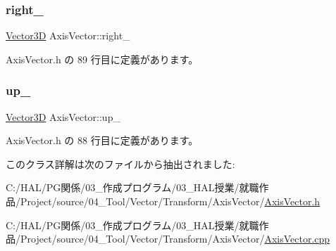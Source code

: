 \subsubsection{\texorpdfstring{right\+\_\+}{right\_}}
{\footnotesize\ttfamily \mbox{\hyperlink{class_vector3_d}{Vector3D}} Axis\+Vector\+::right\+\_\+\hspace{0.3cm}{\ttfamily [private]}}



 Axis\+Vector.\+h の 89 行目に定義があります。

\mbox{\label{class_axis_vector_ab73c08b8dbf399af48b01b4a17bd5d33}} 
\subsubsection{\texorpdfstring{up\+\_\+}{up\_}}
{\footnotesize\ttfamily \mbox{\hyperlink{class_vector3_d}{Vector3D}} Axis\+Vector\+::up\+\_\+\hspace{0.3cm}{\ttfamily [private]}}



 Axis\+Vector.\+h の 88 行目に定義があります。



このクラス詳解は次のファイルから抽出されました\+:\begin{DoxyCompactItemize}
\item 
C\+:/\+H\+A\+L/\+P\+G関係/03\+\_\+作成プログラム/03\+\_\+\+H\+A\+L授業/就職作品/\+Project/source/04\+\_\+\+Tool/\+Vector/\+Transform/\+Axis\+Vector/\mbox{\hyperlink{_axis_vector_8h}{Axis\+Vector.\+h}}\item 
C\+:/\+H\+A\+L/\+P\+G関係/03\+\_\+作成プログラム/03\+\_\+\+H\+A\+L授業/就職作品/\+Project/source/04\+\_\+\+Tool/\+Vector/\+Transform/\+Axis\+Vector/\mbox{\hyperlink{_axis_vector_8cpp}{Axis\+Vector.\+cpp}}\end{DoxyCompactItemize}
